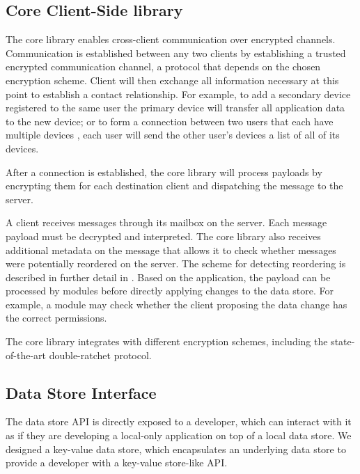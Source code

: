 
\subsection{Core Client-Side library}
The core library enables cross-client communication over encrypted channels. Communication is established between any two clients by establishing a trusted encrypted communication channel, a protocol that depends on the chosen encryption scheme. Client will then exchange all information necessary at this point to establish a contact relationship. For example, to add a secondary device registered to the same user the primary device will transfer all application data to the new device; or to form a connection between two users that each have multiple devices , each user will send the other user's devices a list of all of its devices. 

After a connection is established, the core library will process payloads by encrypting them for each destination client and dispatching the message to the server. 

A client receives messages through its mailbox on the server. Each message payload must be decrypted and interpreted. The core library also receives additional metadata on the message that allows it to check whether messages were potentially reordered on the server. The scheme for detecting reordering is described in further detail in . Based on the application, the payload can be processed by modules before directly applying changes to the data store. For example, a module may check whether the client proposing the data change has the correct permissions. 

 The core library integrates with different encryption schemes, including the state-of-the-art double-ratchet protocol. 


\subsection{Data Store Interface}

The data store API is directly exposed to a developer, which can interact with it as if they are developing a local-only application on top of a local data store. We designed a \name{} key-value data store, which encapsulates an underlying data store to provide a developer with a key-value store-like API. 


